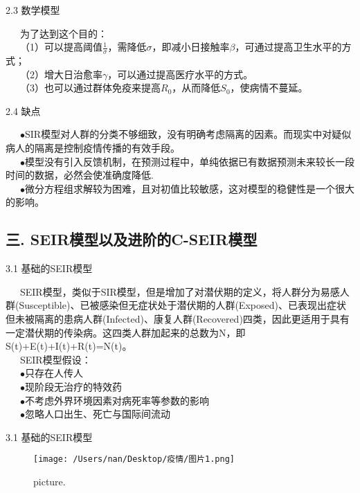 \documentclass[
  ignorenonframetext,
]{beamer}
\begin{document}
\begin{frame}{2.3 数学模型}
\protect\hypertarget{section-10}{}

  为了达到这个目的：\\
  （1）可以提高阈值\(\frac {1} {\sigma}\)，需降低\(\sigma\)，即减小日接触率\(\beta\)，可通过提高卫生水平的方式；\\
  （2）增大日治愈率\(\gamma\)，可以通过提高医疗水平的方式。\\
  （3）也可以通过群体免疫来提高\(R_0\)，从而降低\(S_0\)，使病情不蔓延。

\end{frame}

\begin{frame}{2.4 缺点}
\protect\hypertarget{section-11}{}

  \(\bullet\)SIR模型对人群的分类不够细致，没有明确考虑隔离的因素。而现实中对疑似病人的隔离是控制疫情传播的有效手段。\\
  \(\bullet\)模型没有引入反馈机制，在预测过程中，单纯依据已有数据预测未来较长一段时间的数据，必然会使准确度降低.\\
  \(\bullet\)微分方程组求解较为困难，且对初值比较敏感，这对模型的稳健性是一个很大的影响。

\end{frame}

\hypertarget{seirc-seir}{%
\subsection{三. SEIR模型以及进阶的C-SEIR模型}\label{seirc-seir}}

\begin{frame}{3.1 基础的SEIR模型}
\protect\hypertarget{seir}{}

  SEIR模型，类似于SIR模型，但是增加了对潜伏期的定义，将人群分为易感人群(Susceptible)、已被感染但无症状处于潜伏期的人群(Exposed)、已表现出症状但未被隔离的患病人群(Infected)、康复人群(Recovered)四类，因此更适用于具有一定潜伏期的传染病。这四类人群加起来的总数为N，即S(t)+E(t)+I(t)+R(t)=N(t)。\\
  SEIR模型假设：\\
  \(\bullet\)只存在人传人\\
  \(\bullet\)现阶段无治疗的特效药\\
  \(\bullet\)不考虑外界环境因素对病死率等参数的影响\\
  \(\bullet\)忽略人口出生、死亡与国际间流动

\end{frame}

\begin{frame}{3.1 基础的SEIR模型}
\protect\hypertarget{seir-1}{}

\begin{figure}
\centering
\texttt{[image: /Users/nan/Desktop/疫情/图片1.png]}
\caption{picture.}
\end{figure}

\end{frame}
\end{document}
